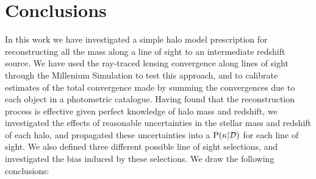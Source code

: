 \documentclass[useAMS,usenatbib]{mn2e}
\begin{document}

\section{Conclusions}
\label{sec:conclude}

In this work we have investigated a simple halo model prescription for
reconstructing all the mass along a line of sight to an intermediate redshift
source. We have used the ray-traced lensing convergence along lines of sight
through the Millenium Simulation to test this approach, and to calibrate
estimates of the total convergence made by summing the convergences due to
each object in a photometric catalogue. Having found that the reconstruction
process is effective given perfect knowledge of halo mass and redshift, we
investigated the effects of reasonable uncertainties in the stellar mass and
redshift of each halo, and propagated these uncertainties into a
${\rm P}(\kappa|{\mathcal{D}})$ for each line of sight. We also defined three different
possible line of sight selections, and investigated the bias induced by these
selections. We draw the following conclusions:
\end{document}
